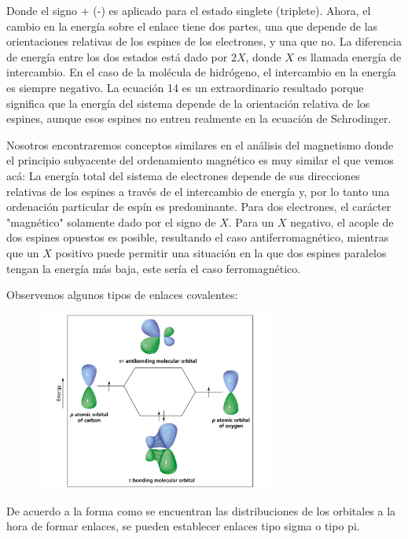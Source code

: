 \documentclass{article}
\begin{document}
Donde el signo + (-) es aplicado para el estado singlete (triplete). Ahora, el cambio en la energía sobre el enlace tiene dos partes, una que depende de las orientaciones relativas de los espines de los electrones, y una que no. La diferencia de energía entre los dos estados está dado por $2X$, donde $X$ es llamada energía de intercambio. En el caso de la molécula de hidrógeno, el intercambio en la energía es siempre negativo. La ecuación 14 es un extraordinario resultado porque significa que la energía del sistema depende de la orientación relativa de los espines, aunque esos espines no entren realmente en la ecuación de Schrodinger.

Nosotros encontraremos conceptos similares en el análisis del magnetismo donde el principio subyacente del ordenamiento magnético es muy similar el que vemos acá: La energía total del sistema de electrones depende de sus direcciones relativas de los espines a través de el intercambio de energía y, por lo tanto una ordenación particular de espín es predominante. Para dos electrones, el carácter "magnético" solamente dado por el signo de $X$. Para un $X$ negativo, el acople de dos espines opuestos es posible, resultando el caso antiferromagnético, mientras que un $X$ positivo puede permitir una situación en la que dos espines paralelos tengan la energía más baja, este sería el caso ferromagnético.

Observemos algunos tipos de enlaces covalentes: 

\begin{figure}[h]
    \centering
    \includegraphics[width=0.7\textwidth]{pi.JPG}
    
    \label{Figura 1}
\end{figure}

De acuerdo a la forma como se encuentran las distribuciones de los orbitales a la hora de formar enlaces, se pueden establecer enlaces tipo sigma o tipo pi.
\end{document}
